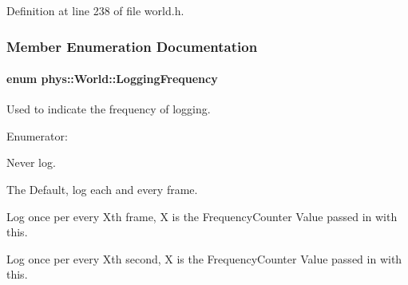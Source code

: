 Definition at line 238 of file world.h.



\subsubsection{Member Enumeration Documentation}
\hypertarget{classphys_1_1World_a8c754464edbb78270fa0ee1e395b963d}{
\paragraph[{LoggingFrequency}]{\setlength{\rightskip}{0pt plus 5cm}enum {\bf phys::World::LoggingFrequency}}\hfill}
\label{classphys_1_1World_a8c754464edbb78270fa0ee1e395b963d}


Used to indicate the frequency of logging. 

\begin{Desc}
\item[Enumerator: ]\par
\begin{description}
\item[{\em 
\hypertarget{classphys_1_1World_a8c754464edbb78270fa0ee1e395b963da477724952d47abb95e5addd925fc2ec6}{
LogNever}
\label{classphys_1_1World_a8c754464edbb78270fa0ee1e395b963da477724952d47abb95e5addd925fc2ec6}
}]Never log. \item[{\em 
\hypertarget{classphys_1_1World_a8c754464edbb78270fa0ee1e395b963dafce667b90c7842e6452d09f4954b6fe7}{
LogOncePerFrame}
\label{classphys_1_1World_a8c754464edbb78270fa0ee1e395b963dafce667b90c7842e6452d09f4954b6fe7}
}]The Default, log each and every frame. \item[{\em 
\hypertarget{classphys_1_1World_a8c754464edbb78270fa0ee1e395b963da017fb8da8ff480a3b3190c96cdddde74}{
LogOncePerXFrames}
\label{classphys_1_1World_a8c754464edbb78270fa0ee1e395b963da017fb8da8ff480a3b3190c96cdddde74}
}]Log once per every Xth frame, X is the FrequencyCounter Value passed in with this. \item[{\em 
\hypertarget{classphys_1_1World_a8c754464edbb78270fa0ee1e395b963da5acb020cb6b0f759ecd25c413927be55}{
LogOncePerXSeconds}
\label{classphys_1_1World_a8c754464edbb78270fa0ee1e395b963da5acb020cb6b0f759ecd25c413927be55}
}]Log once per every Xth second, X is the FrequencyCounter Value passed in with this. \end{description}
\end{Desc}



